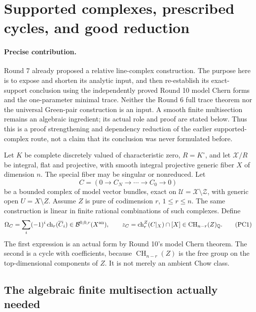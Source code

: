 \section{Supported complexes, prescribed cycles, and good reduction}
\label{r11p:supported-complex}

\paragraph{Precise contribution.}
Round 7 already proposed a relative line-complex construction.  The
purpose here is to expose and shorten its analytic input, and then
re-establish its exact-support conclusion using the independently proved
Round 10 model Chern forms and the one-parameter minimal trace.
Neither the Round 6 full trace theorem nor the universal Green-pair
construction is an input.  A smooth finite multisection remains an
algebraic ingredient; its actual role and proof are stated below.
Thus this is a proof strengthening and dependency reduction of the
earlier supported-complex route, not a claim that its conclusion was
never formulated before.

Let $K$ be complete discretely valued of characteristic zero, $R=K^\circ$,
and let $\mathcal X/R$ be integral, flat and projective, with smooth
integral projective generic fiber $X$ of dimension $n$.
The special fiber may be singular or nonreduced.  Let
\[
       C=(0\longrightarrow C_N\longrightarrow\cdots
                             \longrightarrow C_0\longrightarrow0)
\]
be a bounded complex of model vector bundles, exact on
$\mathcal U=\mathcal X\setminus\mathcal Z$, with generic open
$U=X\setminus Z$.  Assume $Z$ is pure of codimension $r$, $1\leq r\leq n$.
The same construction is linear in finite rational combinations of
such complexes.  Define
\[
 \Omega_C=\sum_i(-1)^i\operatorname{ch}_r(\overline C_i)
                              \in\mathcal B^{0,0,r}(X^{\rm an}),
 \qquad
 z_C=\operatorname{ch}^{Z}_r(C|_X)\cap[X]
                              \in\operatorname{CH}_{n-r}(Z)_{\mathbb Q}.
\tag{PC1}\label{r11p:omega-and-cycle}
\]
The first expression is an actual form by Round 10's model Chern theorem.
The second is a cycle with coefficients, because
$\operatorname{CH}_{n-r}(Z)$ is the free group on the top-dimensional
components of $Z$.  It is not merely an ambient Chow class.

\subsection{The algebraic finite multisection actually needed}

